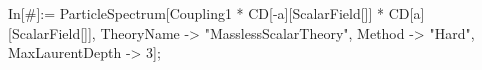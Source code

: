 In[\#]:= ParticleSpectrum[Coupling1 * CD[-a][ScalarField[]] * CD[a][ScalarField[]], TheoryName -> "MasslessScalarTheory", Method -> "Hard", MaxLaurentDepth -> 3]; 